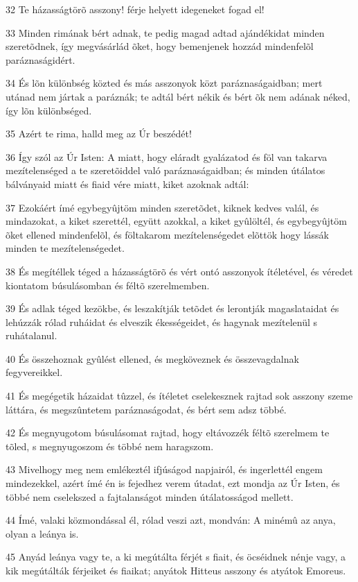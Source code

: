 \par 32 Te házasságtörõ asszony! férje helyett idegeneket fogad el!
\par 33 Minden rimának bért adnak, te pedig magad adtad ajándékidat minden szeretõdnek, így megvásárlád õket, hogy bemenjenek hozzád mindenfelõl paráznaságidért.
\par 34 És lõn különbség közted és más asszonyok közt paráznaságaidban; mert utánad nem jártak a paráznák; te adtál bért nékik és bért õk nem adának néked, így lõn különbséged.
\par 35 Azért te rima, halld meg az Úr beszédét!
\par 36 Így szól az Úr Isten: A miatt, hogy eláradt gyalázatod és föl van takarva mezítelenséged a te szeretõiddel való paráznaságaidban; és minden útálatos bálványaid miatt és fiaid vére miatt, kiket azoknak adtál:
\par 37 Ezokáért ímé egybegyûjtöm minden szeretõdet, kiknek kedves valál, és mindazokat, a kiket szerettél, együtt azokkal, a kiket gyûlöltél, és egybegyûjtöm õket ellened mindenfelõl, és föltakarom mezítelenségedet elõttök hogy lássák minden te mezítelenségedet.
\par 38 És megítéllek téged a házasságtörõ és vért ontó asszonyok ítéletével, és véredet kiontatom búsulásomban és féltõ szerelmemben.
\par 39 És adlak téged kezökbe, és leszakítják tetõdet és lerontják magaslataidat és lehúzzák rólad ruháidat és elveszik ékességeidet, és hagynak mezítelenül  s ruhátalanul.
\par 40 És összehoznak gyûlést ellened, és megköveznek és összevagdalnak fegyvereikkel.
\par 41 És megégetik házaidat tûzzel, és ítéletet cselekesznek rajtad sok asszony szeme láttára, és megszûntetem paráznaságodat, és bért sem adsz többé.
\par 42 És megnyugotom búsulásomat rajtad, hogy eltávozzék féltõ szerelmem te tõled, s megnyugoszom és többé nem haragszom.
\par 43 Mivelhogy meg nem emlékeztél ifjúságod napjairól, és ingerlettél engem mindezekkel, azért ímé én is fejedhez verem útadat, ezt mondja az Úr Isten, és többé nem cselekszed a fajtalanságot minden útálatosságod mellett.
\par 44 Ímé, valaki közmondással él, rólad veszi azt, mondván: A minémû az anya, olyan a leánya is.
\par 45 Anyád leánya vagy te, a ki megútálta férjét s fiait, és öcséidnek nénje vagy, a kik megútálták férjeiket és fiaikat; anyátok Hitteus asszony és atyátok Emoreus.
